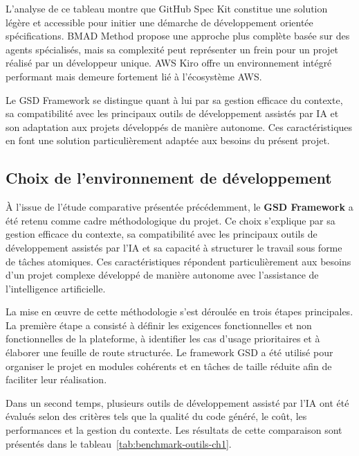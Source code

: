 L'analyse de ce tableau montre que GitHub Spec Kit constitue une solution légère et accessible pour initier une démarche de développement orientée spécifications. BMAD Method propose une approche plus complète basée sur des agents spécialisés, mais sa complexité peut représenter un frein pour un projet réalisé par un développeur unique. AWS Kiro offre un environnement intégré performant mais demeure fortement lié à l'écosystème AWS.

Le GSD Framework se distingue quant à lui par sa gestion efficace du contexte, sa compatibilité avec les principaux outils de développement assistés par IA et son adaptation aux projets développés de manière autonome. Ces caractéristiques en font une solution particulièrement adaptée aux besoins du présent projet.

\subsection{Choix de l'environnement de développement}

À l'issue de l'étude comparative présentée précédemment, le \textbf{GSD Framework} a été retenu comme cadre méthodologique du projet. Ce choix s'explique par sa gestion efficace du contexte, sa compatibilité avec les principaux outils de développement assistés par l'IA et sa capacité à structurer le travail sous forme de tâches atomiques. Ces caractéristiques répondent particulièrement aux besoins d'un projet complexe développé de manière autonome avec l'assistance de l'intelligence artificielle.

La mise en œuvre de cette méthodologie s'est déroulée en trois étapes principales. La première étape a consisté à définir les exigences fonctionnelles et non fonctionnelles de la plateforme, à identifier les cas d'usage prioritaires et à élaborer une feuille de route structurée. Le framework GSD a été utilisé pour organiser le projet en modules cohérents et en tâches de taille réduite afin de faciliter leur réalisation.

Dans un second temps, plusieurs outils de développement assisté par l'IA ont été évalués selon des critères tels que la qualité du code généré, le coût, les performances et la gestion du contexte. Les résultats de cette comparaison sont présentés dans le tableau~\ref{tab:benchmark-outils-ch1}.

